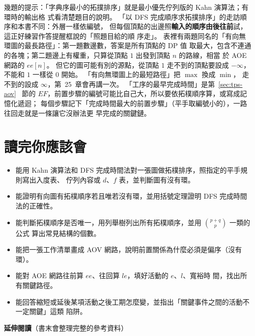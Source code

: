 幾題的提示：「字典序最小的拓撲排序」就是最小優先佇列版的 Kahn 演算法；有環時的輸出格
式看清楚題目的說明。 「以 DFS 完成順序求拓撲排序」的走訪順序和本書不同：外層一樣依編號，
但每個頂點的出邊照\textbf{輸入的順序由後往前}試，這正好練習作答提醒框說的「照題目給的順
序走」。 表裡有兩題同名的「有向無環圖的最長路徑」：第一題數邊數，答案是所有頂點的 DP 值
取最大，包含不連通的各塊；第二題邊上有權重，只算從頂點 $1$ 出發到頂點 $n$ 的路線，相當
於 AOE 網路的 $\mathit{ee}[n]$。 但它的圖可能有別的源點，從頂點 $1$ 走不到的頂點要設成
$-\infty$，不能和 $1$ 一樣從 $0$ 開始。 「有向無環圖上的最短路徑」把 $\max$ 換成 $\min$，
走不到的設成 $\infty$，第~25~章會再講一次。 「工序的最早完成時間」是第~\ref{sec:tps-aov}~
節的 $\mathit{EF}$，前置步驟的編號可能比自己大，所以要依拓樸順序算，或寫成記憶化遞迴；
每個步驟記下「完成時間最大的前置步驟」（平手取編號小的），一路往回走就是一條讓它沒辦法更
早完成的關鍵鏈。

\section{讀完你應該會}
\label{sec:tps-checklist}

\begin{itemize}
\item 能用 Kahn 演算法和 DFS 完成時間法對一張圖做拓樸排序，照指定的平手規則寫出入度表、
佇列內容或 $d$、$f$ 表，並判斷圖有沒有環。
\item 能證明有向圖有拓樸順序若且唯若沒有環，並用括號定理證明 DFS 完成時間法的正確性。
\item 能判斷拓樸順序是否唯一，用列舉樹列出所有拓樸順序，並用 $\binom{p + q}{p}$ 一類的公式
算出常見結構的個數。
\item 能把一張工作清單畫成 AOV 網路，說明前置關係為什麼必須是偏序（沒有環）。
\item 能對 AOE 網路往前算 $\mathit{ee}$、往回算 $\mathit{le}$，填好活動的 $e$、$l$、寬裕時
間，找出所有關鍵路徑。
\item 能回答縮短或延後某項活動之後工期怎麼變，並指出「關鍵事件之間的活動不一定關鍵」這類
陷阱。
\end{itemize}

\textbf{延伸閱讀}（書末會整理完整的參考資料）


